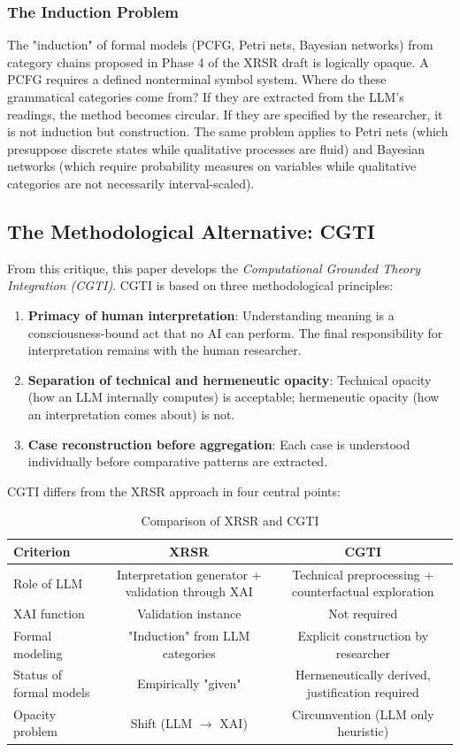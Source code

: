 \documentclass[12pt,a4paper]{article}
\begin{document}
\subsubsection{The Induction Problem}

The "induction" of formal models (PCFG, Petri nets, Bayesian networks) from category chains proposed in Phase 4 of the XRSR draft is logically opaque. A PCFG requires a defined nonterminal symbol system. Where do these grammatical categories come from? If they are extracted from the LLM's readings, the method becomes circular. If they are specified by the researcher, it is not induction but construction. The same problem applies to Petri nets (which presuppose discrete states while qualitative processes are fluid) and Bayesian networks (which require probability measures on variables while qualitative categories are not necessarily interval-scaled).

\subsection{The Methodological Alternative: CGTI}

From this critique, this paper develops the \textit{Computational Grounded Theory Integration (CGTI)}. CGTI is based on three methodological principles:

\begin{enumerate}
    \item \textbf{Primacy of human interpretation}: Understanding meaning is a consciousness-bound act that no AI can perform. The final responsibility for interpretation remains with the human researcher.
    \item \textbf{Separation of technical and hermeneutic opacity}: Technical opacity (how an LLM internally computes) is acceptable; hermeneutic opacity (how an interpretation comes about) is not.
    \item \textbf{Case reconstruction before aggregation}: Each case is understood individually before comparative patterns are extracted.
\end{enumerate}

CGTI differs from the XRSR approach in four central points:

\begin{table}[H]
\centering
\caption{Comparison of XRSR and CGTI}
\label{tab:vergleich}
\begin{tabular}{@{}lcc@{}}
\toprule
Criterion & XRSR & CGTI \\ 
\midrule
Role of LLM & Interpretation generator + validation through XAI & Technical preprocessing + counterfactual exploration \\
XAI function & Validation instance & Not required \\
Formal modeling & "Induction" from LLM categories & Explicit construction by researcher \\
Status of formal models & Empirically "given" & Hermeneutically derived, justification required \\
Opacity problem & Shift (LLM $\rightarrow$ XAI) & Circumvention (LLM only heuristic) \\
\bottomrule
\end{tabular}
\end{table}
\end{document}
